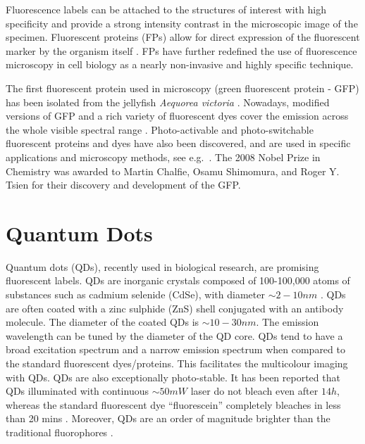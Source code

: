 Fluorescence labels can be attached to the structures of interest with high specificity and provide a strong intensity contrast in the microscopic image of the specimen. Fluorescent proteins (FPs) allow for direct expression of the fluorescent marker by the organism itself \cite{Fernandez-Suarez2008}. FPs have further redefined the use of fluorescence microscopy in cell biology as a nearly non-invasive and highly specific technique. 

The first fluorescent protein used in microscopy (green fluorescent protein - GFP) has been isolated from the jellyfish {\it Aequorea victoria} \cite{Tsien1998}. Nowadays, modified versions of GFP and a rich variety of fluorescent dyes cover the emission across the whole visible spectral range \cite{Fernandez-Suarez2008}. Photo-activable and photo-switchable fluorescent proteins and dyes have also been discovered, and are used in specific applications and microscopy methods, see e.g.\ \cite{Bock2007,Hirvonen2008, Rego2011a}. The 2008 Nobel Prize in Chemistry was awarded to Martin Chalfie, Osamu Shimomura, and Roger Y. Tsien for their discovery and development of the GFP.
 

\section{Quantum Dots\label{sec:Quantum-dots}}

Quantum dots (QDs), recently used in biological research, are promising fluorescent labels.  QDs are inorganic crystals composed of 100-100,000 atoms of substances such as cadmium selenide (CdSe), with diameter $\sim2-10\unit{nm}$ \cite{Alivisatos1996}. QDs are often coated with a zinc sulphide (ZnS) shell conjugated with an antibody molecule. The diameter of the coated QDs is $\sim10-30\unit{nm}$. The emission wavelength can be tuned by the diameter of the QD core. QDs tend to have a broad excitation spectrum and a narrow emission spectrum when compared to the standard fluorescent dyes/proteins. This facilitates the multicolour imaging with QDs. QDs are also exceptionally photo-stable. It has been reported that QDs illuminated with continuous $\sim 50\unit{mW}$ laser do not bleach even after $14\unit{h}$, whereas the standard fluorescent dye ``fluorescein'' completely bleaches in less than 20 mins \cite{Jaiswal2004}. Moreover, QDs are an order of magnitude brighter than the traditional fluorophores \cite{Resch-Genger2008,Walling2009}. 

